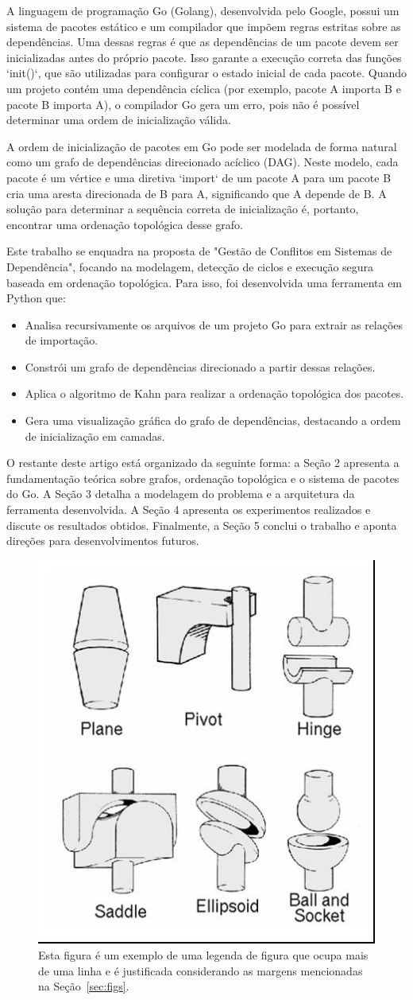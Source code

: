 \documentclass[12pt]{article}
\begin{document}
A linguagem de programação Go (Golang), desenvolvida pelo Google, possui um sistema de pacotes estático e um compilador que impõem regras estritas sobre as dependências. Uma dessas regras é que as dependências de um pacote devem ser inicializadas antes do próprio pacote. Isso garante a execução correta das funções `init()`, que são utilizadas para configurar o estado inicial de cada pacote. Quando um projeto contém uma dependência cíclica (por exemplo, pacote A importa B e pacote B importa A), o compilador Go gera um erro, pois não é possível determinar uma ordem de inicialização válida.

A ordem de inicialização de pacotes em Go pode ser modelada de forma natural como um grafo de dependências direcionado acíclico (DAG). Neste modelo, cada pacote é um vértice e uma diretiva `import` de um pacote A para um pacote B cria uma aresta direcionada de B para A, significando que A depende de B. A solução para determinar a sequência correta de inicialização é, portanto, encontrar uma ordenação topológica desse grafo.

Este trabalho se enquadra na proposta de "Gestão de Conflitos em Sistemas de Dependência", focando na modelagem, detecção de ciclos e execução segura baseada em ordenação topológica. Para isso, foi desenvolvida uma ferramenta em Python que:
\begin{itemize}
    \item Analisa recursivamente os arquivos de um projeto Go para extrair as relações de importação.
    \item Constrói um grafo de dependências direcionado a partir dessas relações.
    \item Aplica o algoritmo de Kahn para realizar a ordenação topológica dos pacotes.
    \item Gera uma visualização gráfica do grafo de dependências, destacando a ordem de inicialização em camadas.
\end{itemize}

O restante deste artigo está organizado da seguinte forma: a Seção 2 apresenta a fundamentação teórica sobre grafos, ordenação topológica e o sistema de pacotes do Go. A Seção 3 detalha a modelagem do problema e a arquitetura da ferramenta desenvolvida. A Seção 4 apresenta os experimentos realizados e discute os resultados obtidos. Finalmente, a Seção 5 conclui o trabalho e aponta direções para desenvolvimentos futuros.

\begin{figure}[ht]
\centering
\includegraphics[width=.3\textwidth]{fig2.jpg}
\caption{Esta figura é um exemplo de uma legenda de figura que ocupa mais de uma
linha e é justificada considerando as margens mencionadas na Seção~\ref{sec:figs}.}
\label{fig:exampleFig2}
\end{figure}
\end{document}

